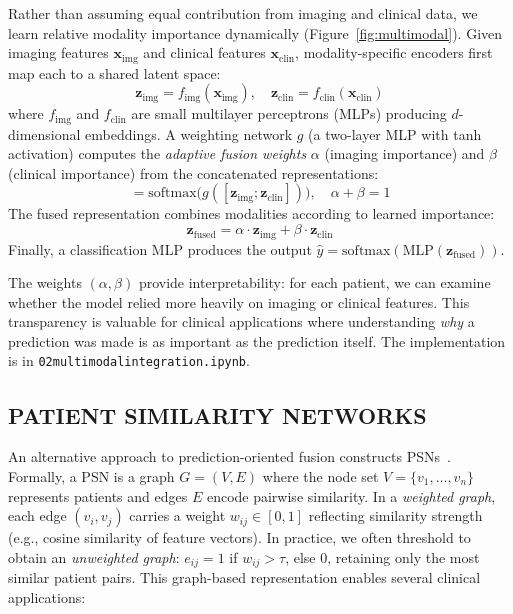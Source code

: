 \documentclass[krantz2,ChapterTOCs]{krantz}
\newcommand{\notebook}[1]{\texttt{\def\_{\textunderscore\allowbreak}#1}}
\begin{document}
Rather than assuming equal contribution from imaging and clinical data, we learn relative modality importance dynamically (Figure~\ref{fig:multimodal}).
Given imaging features $\mathbf{x}_{\text{img}}$ and clinical features $\mathbf{x}_{\text{clin}}$, modality-specific encoders first map each to a shared latent space:
\begin{equation*}
\mathbf{z}_{\text{img}} = f_{\text{img}}(\mathbf{x}_{\text{img}}), \quad \mathbf{z}_{\text{clin}} = f_{\text{clin}}(\mathbf{x}_{\text{clin}})
\end{equation*}
where $f_{\text{img}}$ and $f_{\text{clin}}$ are small multilayer perceptrons (MLPs) producing $d$-dimensional embeddings.
A weighting network $g$ (a two-layer MLP with tanh activation) computes the \emph{adaptive fusion weights} $\alpha$ (imaging importance) and $\beta$ (clinical importance) from the concatenated representations:
\begin{equation*}
[\alpha, \beta] = \mathrm{softmax}\bigl(g([\mathbf{z}_{\text{img}}; \mathbf{z}_{\text{clin}}])\bigr), \quad \alpha + \beta = 1
\end{equation*}
The fused representation combines modalities according to learned importance:
\begin{equation*}
\mathbf{z}_{\text{fused}} = \alpha \cdot \mathbf{z}_{\text{img}} + \beta \cdot \mathbf{z}_{\text{clin}}
\end{equation*}
Finally, a classification MLP produces the output $\hat{y} = \mathrm{softmax}(\mathrm{MLP}(\mathbf{z}_{\text{fused}}))$.

The weights $(\alpha, \beta)$ provide interpretability: for each patient, we can examine whether the model relied more heavily on imaging or clinical features.
This transparency is valuable for clinical applications where understanding \emph{why} a prediction was made is as important as the prediction itself.
The implementation is in \notebook{02\_multimodal\_integration.ipynb}.

\subsection{PATIENT SIMILARITY NETWORKS}

An alternative approach to prediction-oriented fusion constructs PSNs~\citep{pai2018patient}.
Formally, a PSN is a graph $G = (V, E)$ where the node set $V = \{v_1, \ldots, v_n\}$ represents patients and edges $E$ encode pairwise similarity.
In a \emph{weighted graph}, each edge $(v_i, v_j)$ carries a weight $w_{ij} \in [0,1]$ reflecting similarity strength (e.g., cosine similarity of feature vectors).
In practice, we often threshold to obtain an \emph{unweighted graph}: $e_{ij} = 1$ if $w_{ij} > \tau$, else $0$, retaining only the most similar patient pairs.
This graph-based representation enables several clinical applications:
\end{document}
